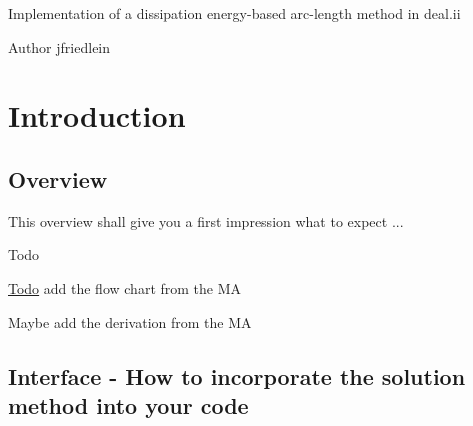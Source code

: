 Implementation of a dissipation energy-\/based arc-\/length method in deal.\+ii\begin{DoxyAuthor}{Author}
jfriedlein
\end{DoxyAuthor}
\hypertarget{index_intro}{}\section{Introduction}\label{index_intro}
\hypertarget{index_subsec_overview}{}\subsection{Overview}\label{index_subsec_overview}
This overview shall give you a first impression what to expect ... \begin{DoxyRefDesc}{Todo}
\item[\hyperlink{todo__todo000001}{Todo}]add the flow chart from the MA 

Maybe add the derivation from the MA \end{DoxyRefDesc}
\hypertarget{index_subsec_interface}{}\subsection{Interface -\/ How to incorporate the solution method into your code}\label{index_subsec_interface}

